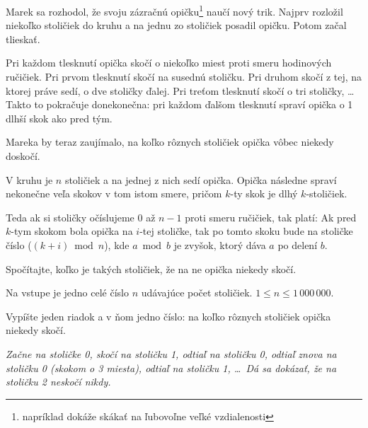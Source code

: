 




Marek sa rozhodol, že svoju zázračnú opičku\footnote{napríklad dokáže skákať na ľubovoľne veľké
vzdialenosti} naučí nový trik. Najprv rozložil niekoľko stoličiek do kruhu
a na jednu zo stoličiek posadil opičku. Potom začal tlieskať.

Pri každom tlesknutí opička skočí o niekoľko miest proti smeru hodinových ručičiek. Pri prvom tlesknutí skočí na susednú
stoličku. Pri druhom skočí z tej, na ktorej práve sedí, o dve stoličky ďalej. Pri treťom tlesknutí
skočí o tri stoličky, \dots{} Takto to pokračuje
donekonečna: pri každom ďalšom tlesknutí spraví opička o 1 dlhší skok ako pred tým.

Mareka by teraz zaujímalo, na koľko rôznych stoličiek opička vôbec niekedy doskočí.


V kruhu je $n$ stoličiek a na jednej z nich sedí opička. Opička následne spraví
nekonečne veľa skokov v tom istom smere, pričom $k$-ty skok je dlhý $k$-stoličiek.

Teda ak si stoličky očíslujeme 0 až $n-1$ proti smeru ručičiek, tak platí:
Ak pred $k$-tym skokom bola opička na $i$-tej stoličke, tak po tomto skoku bude
na stoličke číslo ($(k+i) \bmod n$), kde $a\bmod b$ je zvyšok, ktorý dáva $a$ po delení $b$.

Spočítajte, koľko je takých stoličiek, že na ne opička niekedy skočí.


Na vstupe je jedno celé číslo $n$ udávajúce počet stoličiek. $1\leq n\leq 1\,000\,000$.


Vypíšte jeden riadok a v ňom jedno číslo: na koľko rôznych stoličiek opička niekedy skočí.



\koniec

{\sl Začne na stoličke 0, skočí na stoličku 1, odtiaľ na stoličku 0, odtiaľ znova na stoličku 0
(skokom o 3 miesta), odtiaľ na stoličku 1, \dots\ Dá sa dokázať, že na stoličku 2 neskočí nikdy.}

\koniec


